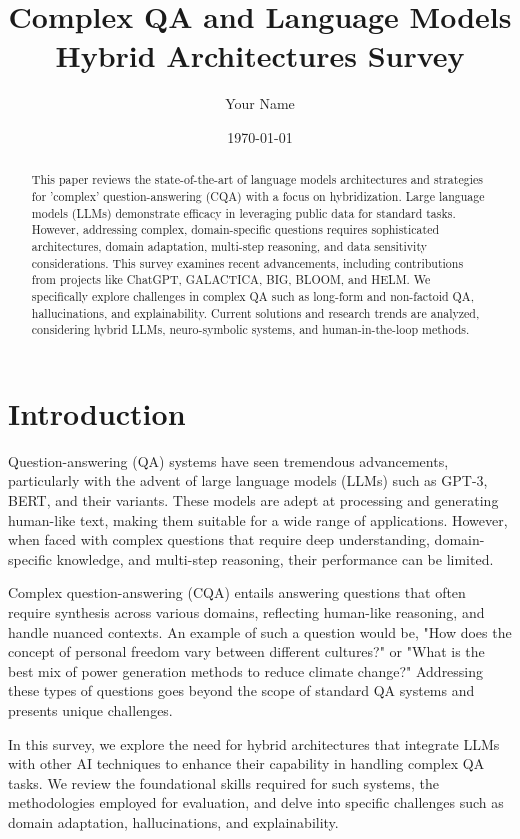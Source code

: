 \documentclass{article}
\title{Complex QA and Language Models Hybrid Architectures Survey}
\author{Your Name}
\date{\today}
\begin{document}
\maketitle

\begin{abstract}
This paper reviews the state-of-the-art of language models architectures and strategies for 'complex' question-answering (CQA) with a focus on hybridization. Large language models (LLMs) demonstrate efficacy in leveraging public data for standard tasks. However, addressing complex, domain-specific questions requires sophisticated architectures, domain adaptation, multi-step reasoning, and data sensitivity considerations. This survey examines recent advancements, including contributions from projects like ChatGPT, GALACTICA, BIG, BLOOM, and HELM. We specifically explore challenges in complex QA such as long-form and non-factoid QA, hallucinations, and explainability. Current solutions and research trends are analyzed, considering hybrid LLMs, neuro-symbolic systems, and human-in-the-loop methods.
\end{abstract}

\tableofcontents

\section{Introduction}
Question-answering (QA) systems have seen tremendous advancements, particularly with the advent of large language models (LLMs) such as GPT-3, BERT, and their variants. These models are adept at processing and generating human-like text, making them suitable for a wide range of applications. However, when faced with complex questions that require deep understanding, domain-specific knowledge, and multi-step reasoning, their performance can be limited.

Complex question-answering (CQA) entails answering questions that often require synthesis across various domains, reflecting human-like reasoning, and handle nuanced contexts. An example of such a question would be, "How does the concept of personal freedom vary between different cultures?" or "What is the best mix of power generation methods to reduce climate change?" Addressing these types of questions goes beyond the scope of standard QA systems and presents unique challenges.

In this survey, we explore the need for hybrid architectures that integrate LLMs with other AI techniques to enhance their capability in handling complex QA tasks. We review the foundational skills required for such systems, the methodologies employed for evaluation, and delve into specific challenges such as domain adaptation, hallucinations, and explainability. 
\end{document}
